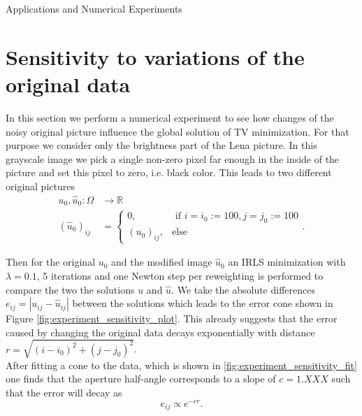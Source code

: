 \begin{chapter}{Applications and Numerical Experiments}
\section{Sensitivity to variations of the original data} %
\label{sec:Sensitivity}
In this section we perform a numerical experiment to see how changes of the noisy original picture influence the global solution of TV
minimization.
For that purpose we consider only the brightness part of the Lena picture. In this grayscale image we pick a single non-zero pixel far enough in the inside of
the picture and set this pixel to zero, i.e. black color. This leads to two different original pictures
\begin{align}
    u_0,\hat{u}_0:\Omega &\to\mathbb{R}\\
    (\hat{u}_0)_{ij}&=\begin{cases}
	0, & \text{ if } i=i_0:=100,j=j_0:=100\\
	(u_0)_{ij}, &\text{else}
    \end{cases}.
\end{align}

Then for the original $u_0$ and the modified image $\hat{u}_0$ an IRLS minimization with $\lambda=0.1$, 5 iterations and one Newton step per reweighting is
performed to compare the two the solutions $u$ and $\hat{u}$. We take the absolute differences $e_{ij}=|u_{ij}-\hat{u}_{ij}|$ between the solutions
which leads to the error cone shown in Figure \ref{fig:experiment_sensitivity_plot}. This already suggests that the
error caused by changing the original data decays exponentially with distance $r=\sqrt{(i-i_0)^{2}+(j-j_0)^{2}}$.\\

After fitting a cone to the data, which is shown in \ref{fig:experiment_sensitivity_fit}
one finds that the aperture half-angle corresponds to a slope of $c=1.XXX$ such that the error will decay as
\begin{equation}
    e_{ij}\propto e^{-cr}.
\end{equation}


\end{chapter}
